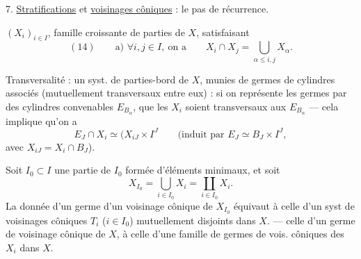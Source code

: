 7. \uline{Stratifications} et \uline{voisinages côniques} : le pas
de récurrence.

$(X_i)_{i\in I}$, famille croissante de parties de $X$,
satisfaisant
\[
(14)\qquad\text{a) }\forall i,j\in I,\ \text{on a}\qquad
X_i\cap X_j=\bigcup_{\alpha\le i,j}X_\alpha.
\]


Transversalité : un syst. de parties-bord  de
$X$, munies de germes de cylindres associés
(mutuellement transversaux entre eux) : si on
représente les germes par des cylindres convenables
$E_{B_\alpha}$,  que les $X_i$ soient transversaux
aux $E_{B_\alpha}$ --- cela implique qu'on a
\[
E_J\cap X_i\simeq (X_{iJ}\times I^J
\qquad
\text{(induit par }E_J\simeq B_J\times I^J,
\]
avec $X_{iJ}=X_i\cap B_J$).

Soit $I_0\subset I$ une partie de $I_0$ formée
d'éléments minimaux,  et soit
\[
X_{I_0}=\bigcup_{i\in I_0}X_i=\coprod_{i\in I_0}X_i.
\]
La donnée d'un germe 
d'un voisinage cônique  de $X_{I_0}$ équivaut à
celle d'un syst de voisinages côniques
$T_i$ ($i\in I_0$) mutuellement disjoints dans $X$. ---
celle d'un germe de voisinage cônique de $X$,
à celle d'une famille de germes de vois.
côniques des $X_i$ dans $X$.
